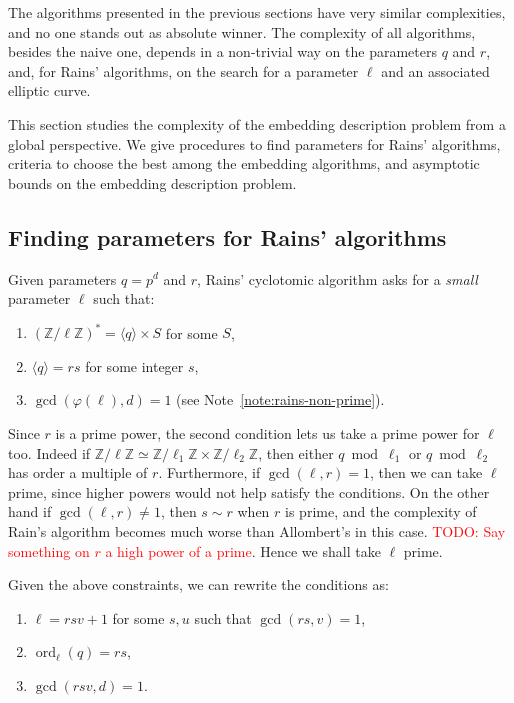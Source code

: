 \documentclass[12pt]{article}
\theoremstyle{plain}
\theoremstyle{definition}
\newcommand{\todo}[1]{\textcolor{red}{TODO: #1}}
\DeclareMathOperator{\order}{ord} %
\def\Z{\ensuremath{\mathbb{Z}}}
\def\euler{\ensuremath{\varphi}}
\newcounter{algorithm}
\begin{document}
The algorithms presented in the previous sections have very similar
complexities, and no one stands out as absolute winner. The complexity
of all algorithms, besides the naive one, depends in a non-trivial way
on the parameters $q$ and $r$, and, for Rains' algorithms, on the
search for a parameter $\ell$ and an associated elliptic curve.

This section studies the complexity of the embedding description
problem from a global perspective. We give procedures to find
parameters for Rains' algorithms, criteria to choose the best among
the embedding algorithms, and asymptotic bounds on the embedding
description problem.


\subsection{Finding parameters for Rains' algorithms}

Given parameters $q=p^d$ and $r$, Rains' cyclotomic algorithm asks for
a \emph{small} parameter $\ell$ such that:
\begin{enumerate}
\item $(\Z/\ell\Z)^\ast = \langle q\rangle \times S$ for some $S$,
\item $\langle q \rangle = rs$ for some integer $s$,
\item $\gcd(\euler(\ell),d)=1$ (see Note~\ref{note:rains-non-prime}).
\end{enumerate}

Since $r$ is a prime power, the second condition lets us take a prime
power for $\ell$ too. Indeed if
$\Z/\ell\Z\simeq\Z/\ell_1\Z\times\Z/\ell_2\Z$, then either
$q\bmod\ell_1$ or $q\bmod\ell_2$ has order a multiple of $r$.
Furthermore, if $\gcd(\ell,r)=1$, then we can take $\ell$ prime, since
higher powers would not help satisfy the conditions. On the other hand
if $\gcd(\ell,r)\ne1$, then $s\sim r$ when $r$ is prime, and the
complexity of Rain's algorithm becomes much worse than Allombert's in
this case. \todo{Say something on $r$ a high power of a prime}. Hence
we shall take $\ell$ prime.

Given the above constraints, we can rewrite the conditions as:
\begin{enumerate}
\item $\ell = rsv + 1$ for some $s,u$ such that $\gcd(rs,v)=1$,
\item $\order_\ell(q) = rs$,
\item $\gcd(rsv,d)=1$.
\end{enumerate}
\end{document}
